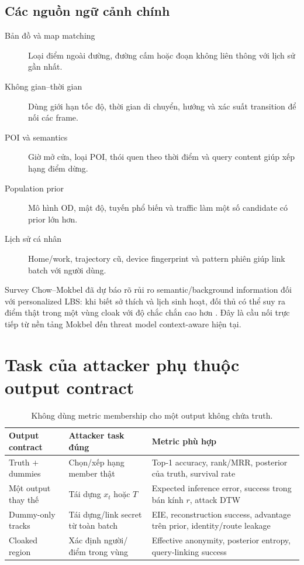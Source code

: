 \documentclass[11pt,a4paper,oneside]{report}
\begin{document}
\subsection{Các nguồn ngữ cảnh chính}

\begin{description}
  \item[Bản đồ và map matching] Loại điểm ngoài đường, đường cấm hoặc đoạn không
  liên thông với lịch sử gần nhất.
  \item[Không gian--thời gian] Dùng giới hạn tốc độ, thời gian di chuyển, hướng và
  xác suất transition để nối các frame.
  \item[POI và semantics] Giờ mở cửa, loại POI, thói quen theo thời điểm và query
  content giúp xếp hạng điểm dừng.
  \item[Population prior] Mô hình OD, mật độ, tuyến phổ biến và traffic làm một số
  candidate có prior lớn hơn.
  \item[Lịch sử cá nhân] Home/work, trajectory cũ, device fingerprint và pattern
  phiên giúp link batch với người dùng.
\end{description}

Survey Chow--Mokbel đã dự báo rõ rủi ro semantic/background information đối với
personalized LBS: khi biết sở thích và lịch sinh hoạt, đối thủ có thể suy ra điểm
thật trong một vùng cloak với độ chắc chắn cao hơn \cite{chow2011trajectory}. Đây
là cầu nối trực tiếp từ nền tảng Mokbel đến threat model context-aware hiện tại.

\section{Task của attacker phụ thuộc output contract}

\begin{table}[htbp]
\centering
\small
\caption{Không dùng metric membership cho một output không chứa truth.}
\label{tab:contract-task-metric}
\begin{tabularx}{\textwidth}{P{3.0cm}P{4.2cm}Y}
\toprule
\textbf{Output contract} & \textbf{Attacker task đúng} & \textbf{Metric phù hợp}\\
\midrule
Truth $+$ dummies & Chọn/xếp hạng member thật & Top-1 accuracy, rank/MRR, posterior của truth, survival rate\\
Một output thay thế & Tái dựng $x_t$ hoặc $T$ & Expected inference error, success trong bán kính $r$, attack DTW\\
Dummy-only tracks & Tái dựng/link secret từ toàn batch & EIE, reconstruction success, advantage trên prior, identity/route leakage\\
Cloaked region & Xác định người/điểm trong vùng & Effective anonymity, posterior entropy, query-linking success\\
\bottomrule
\end{tabularx}
\end{table}
\end{document}
